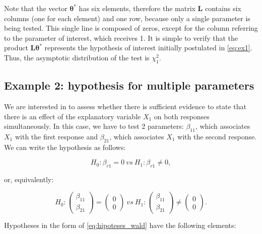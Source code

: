 \documentclass[USenglish]{article}
\theoremstyle{dgthm}
\theoremstyle{dgdef}
\begin{document}
Note that the vector $\boldsymbol{\theta^{*}}$ has six elements, therefore the matrix $\boldsymbol{L}$ contains six columns (one for each element) and one row, because only a single parameter is being tested. This single line is composed of zeros, except for the column referring to the parameter of interest, which receives 1. It is simple to verify that the product $\boldsymbol{L}\boldsymbol{\theta^{*}}$ represents the hypothesis of interest initially postulated in \autoref{eq:ex1}. Thus, the asymptotic distribution of the test is $\chi^2_1$.

\subsection{Example 2: hypothesis for multiple parameters}\label{sec:ex2}

We are interested in to assess whether there is sufficient evidence to state that there is an effect of the explanatory variable $X_1$ on both responses simultaneously. 
In this case, we have to test 2 parameters: $\beta_{11}$, which associates $X_1$ with the first response and $\beta_{21}$, which associates $X_1$ with the second response. 
We can write the hypothesis as follows:

\begin{equation}
\label{eq:ex2}
H_0: \beta_{r1} = 0 \ vs \ H_1: \beta_{r1} \neq 0,
\end{equation}

\noindent or, equivalently:

$$
H_0: 
\begin{pmatrix}
\beta_{11} \\ 
\beta_{21}
\end{pmatrix} 
= 
\begin{pmatrix}
0 \\ 
0
\end{pmatrix}
\ vs \ 
H_1: 
\begin{pmatrix}
\beta_{11} \\ 
\beta_{21}
\end{pmatrix} 
\neq
\begin{pmatrix}
0 \\ 
0 
\end{pmatrix}.
$$

Hypotheses in the form of \autoref{eq:hipoteses_wald} have the following elements:
\end{document}
